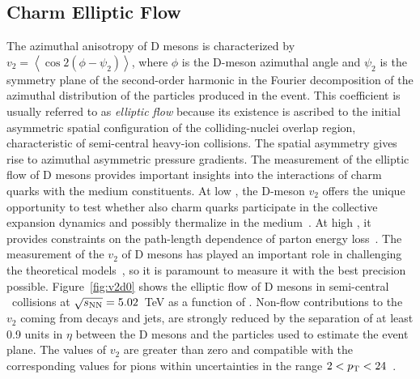 \documentclass[10pt]{article}
\begin{document}
\subsection{Charm Elliptic Flow}
The azimuthal anisotropy of D mesons is characterized by $v_2= \left<\cos 2(\phi - \psi_2)\right>$, where $\phi$ is the D-meson azimuthal angle and $\psi_2$ is the symmetry plane of the second-order
harmonic in the Fourier decomposition of the azimuthal distribution of the particles produced in the event.
This coefficient is usually referred to as \emph{elliptic flow} because its existence is ascribed to the initial asymmetric spatial configuration of the colliding-nuclei overlap region, characteristic of semi-central heavy-ion collisions.
The spatial asymmetry gives rise to azimuthal asymmetric pressure gradients.
The measurement of the elliptic flow of D mesons provides important insights into the interactions of charm quarks with the
medium constituents. At low \pt, the D-meson $v_2$ offers the unique opportunity to test whether also charm quarks participate in
the collective expansion dynamics and possibly thermalize in the medium~\cite{Greco:2003}. At high \pt, it provides constraints on the path-length dependence of parton energy loss~\cite{Gyulassy:2000}.
The measurement of the $v_2$ of D mesons has played an important role in challenging
the theoretical models~\cite{Das:2015}, so it is paramount to measure it with the best precision possible.
Figure~\ref{fig:v2d0} shows the elliptic flow of D mesons in semi-central \PbPb\ collisions at $\sqrt{s_{\rm NN}}=5.02$~TeV as a function of \pt.
Non-flow contributions to the $v_2$ coming from decays and jets, are strongly
reduced by the separation of at least 0.9 units in $\eta$ between the D mesons and the particles used
to estimate the event plane. 
The values of $v_2$ are greater than zero and compatible with the corresponding values for pions within uncertainties in the range $2<p_{\rm T}<24$~\GeVc.
\end{document}
